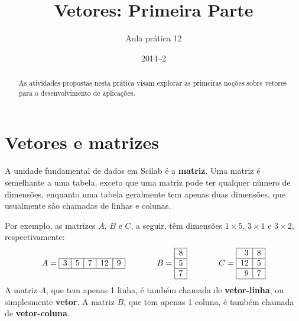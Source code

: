 \documentclass[11pt]{practice}
\begin{document}
\subtitle{Aula prática 12}
\title{Vetores: Primeira Parte}
\author{}
\date{2014--2}
\maketitle

\begin{abstract}
  As atividades propostas nesta prática visam explorar as primeiras
  noções sobre vetores para o desenvolvimento de aplicações.
\end{abstract}

\tableofcontents

\section{Vetores e matrizes}

A unidade fundamental de dados em Scilab é a \textbf{matriz}. Uma matriz
é semelhante a uma tabela, exceto que uma matriz pode ter qualquer
número de dimensões, enquanto uma tabela geralmente tem apenas duas
dimensões, que usualmente são chamadas de linhas e colunas.

Por exemplo, as matrizes $A$, $B$ e $C$, a seguir, têm dimensões
$1\times 5$, $3\times 1$ e $3\times 2$, respectivamente:
\[
\begin{array}{lll}
  A = \begin{array}{|r|r|r|r|r|} \hline
        3 & 5 & 7 & 12 & 9 \\ \hline
      \end{array}
  &
  \hspace*{1cm}
  B = \begin{array}{|r|} \hline
        8 \\ \hline
        5 \\ \hline
        7 \\ \hline
      \end{array}
  &
  \hspace*{1cm}
  C = \begin{array}{|r|r|} \hline
        3 & 8 \\ \hline
        12 & 5 \\ \hline
        9 & 7 \\ \hline
      \end{array} 
\end{array}
\]
A matriz $A$, que tem apenas 1 linha, é também chamada de
\textbf{vetor-linha}, ou simplesmente \textbf{vetor}.  A matriz $B$, que
tem apenas 1 coluna, é também chamada de \textbf{vetor-coluna}.
\end{document}
